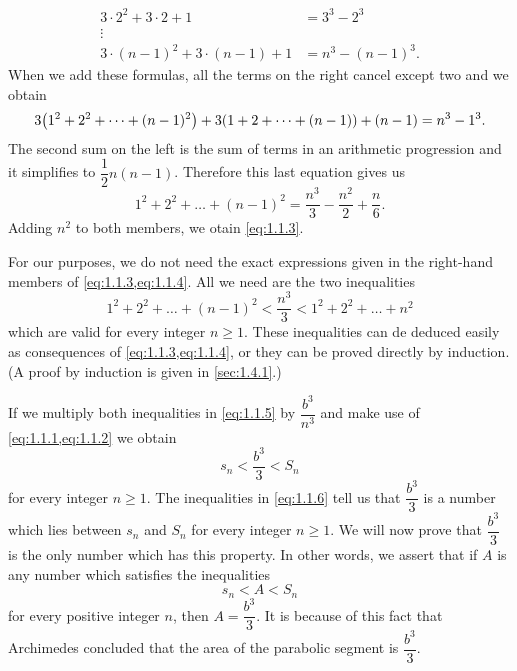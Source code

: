 \begin{note}
\begin{align*}
    3 \cdot 2^2 + 3 \cdot 2 + 1             & = 3^3 - 2^3        \\
    \vdots                                  &                    \\
    3 \cdot (n - 1)^2 + 3 \cdot (n - 1) + 1 & = n^3 - (n - 1)^3.
  \end{align*}
  When we add these formulas, all the terms on the right cancel except two and we obtain
  \[
    3 \pa{1^2 + 2^2 + \dots + (n - 1)^2} + 3 \pa{1 + 2 + \dots + (n - 1)} + (n - 1) = n^3 - 1^3.
  \]
  The second sum on the left is the sum of terms in an arithmetic progression and it simplifies to \(\dfrac{1}{2} n (n - 1)\).
  Therefore this last equation gives us
  \begin{equation}\label{eq:1.1.4}
    1^2 + 2^2 + \dots + (n - 1)^2 = \dfrac{n^3}{3} - \dfrac{n^2}{2} + \dfrac{n}{6}.
  \end{equation}
  Adding \(n^2\) to both members, we otain \cref{eq:1.1.3}.

  For our purposes, we do not need the exact expressions given in the right-hand members of \cref{eq:1.1.3,eq:1.1.4}.
  All we need are the two inequalities
  \begin{equation}\label{eq:1.1.5}
    1^2 + 2^2 + \dots + (n - 1)^2 < \dfrac{n^3}{3} < 1^2 + 2^2 + \dots + n^2
  \end{equation}
  which are valid for every integer \(n \geq 1\).
  These inequalities can de deduced easily as consequences of \cref{eq:1.1.3,eq:1.1.4}, or they can be proved directly by induction.
  (A proof by induction is given in \cref{sec:1.4.1}.)

  If we multiply both inequalities in \cref{eq:1.1.5} by \(\dfrac{b^3}{n^3}\) and make use of \cref{eq:1.1.1,eq:1.1.2} we obtain
  \begin{equation}\label{eq:1.1.6}
    s_n < \dfrac{b^3}{3} < S_n
  \end{equation}
  for every integer \(n \geq 1\).
  The inequalities in \cref{eq:1.1.6} tell us that \(\dfrac{b^3}{3}\) is a number which lies between \(s_n\) and \(S_n\) for every integer \(n \geq 1\).
  We will now prove that \(\dfrac{b^3}{3}\) is the only number which has this property.
  In other words, we assert that if \(A\) is any number which satisfies the inequalities
  \begin{equation}\label{eq:1.1.7}
    s_n < A < S_n
  \end{equation}
  for every positive integer \(n\), then \(A = \dfrac{b^3}{3}\).
  It is because of this fact that Archimedes concluded that the area of the parabolic segment is \(\dfrac{b^3}{3}\).


\end{note}

